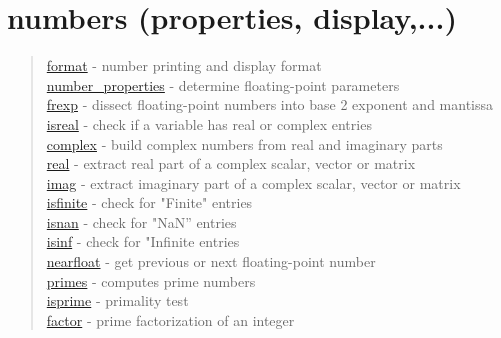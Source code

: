 \chapter*{numbers (properties, display,...)} 


\begin{quote}
\noindent
\hyperlink{format}{format} - number printing and display format\\
\hyperlink{number_properties}{number\_properties} - determine floating-point parameters \\
\hyperlink{frexp}{frexp} - dissect floating-point numbers into base 2 exponent and mantissa\\
\hyperlink{isreal}{isreal} - check if a variable has real or complex entries\\
\hyperlink{complex}{complex} - build complex numbers from real and imaginary parts\\
\hyperlink{real}{real} - extract real part of a complex scalar, vector or matrix\\
\hyperlink{imag}{imag} - extract imaginary part of a complex scalar, vector or matrix\\
\hyperlink{isfinite}{isfinite} - check for "Finite" entries \\
\hyperlink{isnan}{isnan} - check for "NaN'' entries \\
\hyperlink{isnan}{isinf} - check for "Infinite entries \\
\hyperlink{nearfloat}{nearfloat} - get previous or next floating-point number\\
\hyperlink{primes}{primes} - computes prime numbers\\
\hyperlink{isprime}{isprime} - primality test\\
\hyperlink{factor}{factor} - prime factorization of an integer\\
\end{quote}





 
 
 
 
 
 
 

